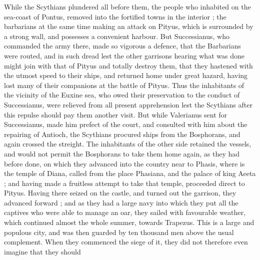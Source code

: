 While the Scythians plundered all before them, the people who inhabited on the sea-coast of Pontus, removed into the fortified towns in the interior ; the barbarians at the same time making an attack on Pityus, which is surrounded by a strong wall, and possesses a convenient harbour. But Successianus, who commanded the army there, made so vigorous a defence, that the Barbarians were routed, and in such dread lest the other garrisons hearing what was done might join with that of Pityus and totally destroy them, that they hastened with the utmost speed to their ships, and returned home under great hazard, having lost many of their companions at the battle of Pityus. Thus the inhabitants of the vicinity of the Euxine sea, who owed their preservation to the conduct of Successianus, were relieved from all present apprehension lest the Scythians after this repulse should pay them another visit. But while Valerianus sent for Successianus, made him prefect of the court, and consulted with him about the repairing of Antioch, the Scythians procured ships from the Bosphorans, and again crossed the streight. The inhabitants of the other side retained the vessels, and would not permit the Bosphorans to take them home again, as they had before done, on which they advanced into the country near to Phasis, where is the temple of Diana, called from the place Phasiana, and the palace of king Aeeta ; and having made a fruitless attempt to take that temple, proceeded direct to Pityus. Having there seized on the castle, and turned out the garrison, they advanced forward ; and as they had a large navy into which they put all the captives who were able to manage an oar, they sailed with favourable weather, which continued almost the whole summer, towards Trapezus. This is a large and populous city, and was then guarded by ten thousand men above the usual complement. When they commenced the siege of it, they did not therefore even imagine that they should
